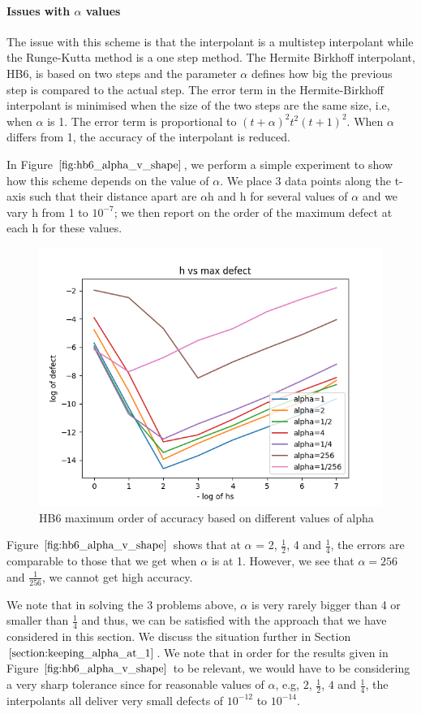 \documentclass{article}
\begin{document}
\paragraph{Issues with $\alpha$ values}
The issue with this scheme is that the interpolant is a multistep interpolant while the Runge-Kutta method is a one step method. The Hermite Birkhoff interpolant, HB6, is based on two steps and the parameter $\alpha$ defines how big the previous step is compared to the actual step. The error term in the Hermite-Birkhoff interpolant is minimised when the size of the two steps are the same size, i.e, when $\alpha$ is 1. The error term is proportional to $(t + \alpha)^2t^2(t + 1)^2$. When $\alpha$ differs from 1, the accuracy of the interpolant is reduced.

In Figure $\ref{fig:hb6_alpha_v_shape}$, we perform a simple experiment to show how this scheme depends on the value of $\alpha$. We place 3 data points along the t-axis such that their distance apart are $\alpha$h and h for several values of $\alpha$ and we vary h from 1 to $10^{-7}$; we then report on the order of the maximum defect at each h for these values.

\begin{figure}[H]
\centering
\includegraphics[width=0.7\linewidth]{./figures/hb6_alpha_v_shape}
\caption{HB6 maximum order of accuracy based on different values of alpha}
\label{fig:hb6_alpha_v_shape}
\end{figure}

Figure $\ref{fig:hb6_alpha_v_shape}$ shows that at $\alpha$ = 2, $\frac{1}{2}$, 4 and $\frac{1}{4}$, the errors are comparable to those that we get when $\alpha$ is at 1. However, we see that $\alpha = 256$ and $\frac{1}{256}$, we cannot get high accuracy.

We note that in solving the 3 problems above, $\alpha$ is very rarely bigger than 4 or smaller than $\frac{1}{4}$ and thus, we can be satisfied with the approach that we have considered in this section. We discuss the situation further in Section $\ref{section:keeping_alpha_at_1}$. We note that in order for the results given in Figure $\ref{fig:hb6_alpha_v_shape}$ to be relevant, we would have to be considering a very sharp tolerance since for reasonable values of $\alpha$, e.g, $2$, $\frac{1}{2}$, $4$ and $\frac{1}{4}$, the interpolants all deliver very small defects of $10^{-12}$ to $10^{-14}$.
\end{document}
